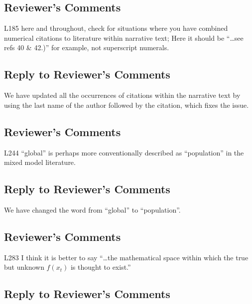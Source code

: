 \documentclass[
]{article}
\begin{document}
\hypertarget{reviewers-comments-20}{%
\subsection{Reviewer's Comments}\label{reviewers-comments-20}}

L185 here and throughout, check for situations where you have combined numerical citations to literature within narrative text; Here it should be ``\ldots see refs 40 \& 42.)'' for example, not superscript numerals.

\hypertarget{section-21}{%
\subsection{\texorpdfstring{\textcolor{reviewersblue} {Reply to Reviewer's Comments}}{}}\label{section-21}}

We have updated all the occurrences of citations within the narrative text by using the last name of the author followed by the citation, which fixes the issue.

\hypertarget{reviewers-comments-21}{%
\subsection{Reviewer's Comments}\label{reviewers-comments-21}}

L244 ``global'' is perhaps more conventionally described as ``population'' in the mixed model literature.

\hypertarget{section-22}{%
\subsection{\texorpdfstring{\textcolor{reviewersblue} {Reply to Reviewer's Comments}}{}}\label{section-22}}

We have changed the word from ``global'' to ``population''.

\hypertarget{reviewers-comments-22}{%
\subsection{Reviewer's Comments}\label{reviewers-comments-22}}

L283 I think it is better to say ``\ldots the mathematical space within which the true but unknown \(f(x_t)\) is thought to exist.''

\hypertarget{section-23}{%
\subsection{\texorpdfstring{\textcolor{reviewersblue} {Reply to Reviewer's Comments}}{}}\label{section-23}}
\end{document}
